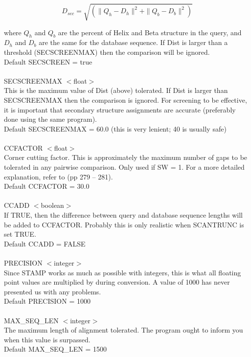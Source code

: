     \[
    D_{sec} = \sqrt{(\|Q_{h} - D_{h}\|^{2} + \|Q_{b} - D_{b}\|^{2})}
    \]

    where $Q_{h}$ and $Q_{b}$ are the percent of Helix and Beta
    structure in the query, and $D_{h}$ and $D_{b}$ are the same for the
    database sequence.  If Dist is larger than a threshold
    (SECSCREENMAX) then the comparison will be ignored.\\
    Default SECSCREEN = true\\
    \\
    SECSCREENMAX $<$float$>$\\
    This is the maximum value of Dist (above) tolerated.  If Dist is
    larger than SECSCREENMAX then the comparison is ignored.  For
    screening to be effective, it is important that secondary structure
    assignments are accurate (preferably done using the same program).\\
    Default SECSCREENMAX = 60.0 (this is very lenient; 40 is usually safe)\\
    \\
    CCFACTOR $<$float$>$\\
    Corner cutting factor.  This is approximately the maximum number of
    gaps to be tolerated in any pairwise comparison.  Only used if SW = 1.
    For a more  detailed explanation, refer to \cite{timewarps} (pp 
    279 -- 281).\\
    Default CCFACTOR = 30.0\\
    \\
    CCADD $<$boolean$>$\\
    If TRUE, then the difference between query and database sequence
    lengths will be added to CCFACTOR.  Probably this is only realistic
    when SCANTRUNC is set TRUE.\\
    Default CCADD = FALSE\\
    \\
    PRECISION $<$integer$>$\\
    Since STAMP works as much as possible with integers, this is what
    all floating point values are multiplied by during conversion.  A
    value of 1000 has never presented us with any problems.\\
    Default PRECISION = 1000\\
    \\
    MAX\_SEQ\_LEN $<$integer$>$\\
    The maximum length of alignment tolerated.  The program ought to 
    inform you when this value is surpassed.\\
    Default MAX\_SEQ\_LEN = 1500\\

